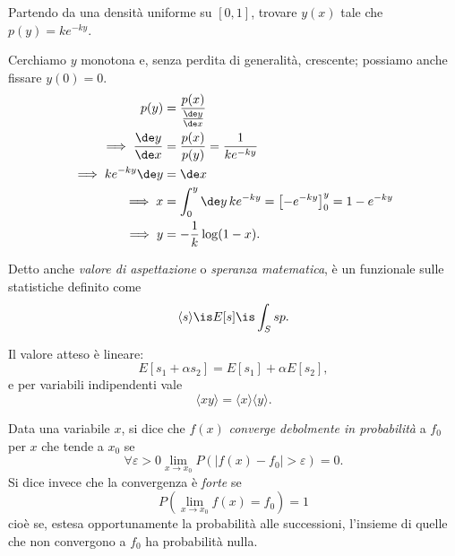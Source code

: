 \begin{exercise}
	Partendo da una densità uniforme su $[0,1]$,
	trovare $y(x)$ tale che $p(y) = ke^{-ky}$.
\end{exercise}

\begin{solution}
	Cerchiamo $y$ monotona e, senza perdita di generalità, crescente; possiamo anche fissare $y(0) = 0$.
	\begin{align*}
		p(y) &= \frac{p(x)}{\frac{\de y}{\de x}} \\
		\implies \frac{\de y}{\de x} &= \frac{p(x)}{p(y)} = \frac{1}{ke^{-ky}}\\
		\implies ke^{-ky}\de y &= \de x \\
		\implies x &= \int_{0}^{y} \de y\, ke^{-ky} = \left[ -e^{-ky} \right]_{0}^{y} = 1 - e^{-ky} \\
		\implies y &= -\frac1k \log(1-x).
	\end{align*}
\end{solution}

\begin{definition}
	Detto anche \emph{valore di aspettazione} o \emph{speranza matematica},
	è un funzionale sulle statistiche definito come
	\begin{equation*}
		\langle s \rangle \is E[s] \is \int_S sp.
	\end{equation*}
\end{definition}

\noindent Il valore atteso è lineare:
\begin{equation*}
	E[s_1+\alpha s_2] = E[s_1] + \alpha E[s_2],
\end{equation*}
e per variabili indipendenti vale
\begin{equation*}
	\langle xy \rangle = \langle x \rangle \langle y \rangle.
\end{equation*}

\begin{definition}
	Data una variabile $x$, si dice che $f(x)$ \emph{converge debolmente in probabilità} a $f_0$ per $x$ che tende a $x_0$ se
	\begin{equation*}
		\forall\varepsilon > 0 \lim_{x\to x_0} P\left( \left| f(x) - f_0 \right| > \varepsilon \right) = 0.
	\end{equation*}
	Si dice invece che la convergenza è \emph{forte} se
	\begin{equation*}
		P\left( \lim_{x\to x_0} f(x) = f_0 \right) = 1
	\end{equation*}
	cioè se, estesa opportunamente la probabilità alle successioni, l'insieme di quelle che non convergono a $f_0$ ha probabilità nulla.
\end{definition}

